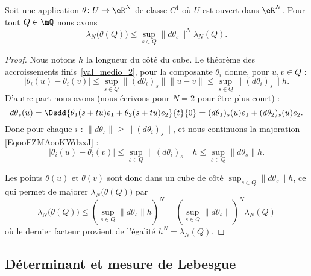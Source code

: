 \begin{lemma}      \label{LemooJCEDooBRyjRg}
	Soit une application \( \theta\colon U\to \eR^N\) de classe \( C^1\) où \( U\) est ouvert dans \( \eR^N\). Pour tout \( Q\in\mQ\) nous avons
	\begin{equation}
		\lambda_N\big( \theta(Q) \big)\leq\sup_{s\in Q}\| d\theta_s \|^N\lambda_N(Q).
	\end{equation}
\end{lemma}

\begin{proof}
	Nous notons \( h\) la longueur du côté du cube. Le théorème des accroissements finis~\ref{val_medio_2}, pour la composante \( \theta_i\) donne, pour \( u,v\in Q\) :
	\begin{equation}        \label{EqooFZMAooKWdzxJ}
		\big|  \theta_i(u)-\theta_i(v) \big|\leq\sup_{s\in Q}\| (d\theta_i)_s \|\| u-v \|\leq \sup_{s\in Q}\| (d\theta_i)_s \|h.
	\end{equation}
	D'autre part nous avons (nous écrivons pour \( N=2\) pour être plus court) :
	\begin{equation}
		d\theta_s(u)=\Dsdd{ \theta_1(s+tu)e_1+\theta_2(s+tu)e_2 }{t}{0}=(d\theta_1)_s(u)e_1+(d\theta_2)_s(u)e_2.
	\end{equation}
	Donc pour chaque \( i\) : \( \| d\theta_s \|\geq \| (d\theta_i)_s \|\), et nous continuons la majoration \eqref{EqooFZMAooKWdzxJ} :
	\begin{equation}
		\big|  \theta_i(u)-\theta_i(v) \big|\leq \sup_{s\in Q}\| (d\theta_i)_s \|h\leq \sup_{s\in Q}\| d\theta_s \|h.
	\end{equation}

	Les points \( \theta(u)\) et \( \theta(v)\) sont donc dans un cube de côté \( \sup_{s\in Q}\| d\theta_s \|h\), ce qui permet de majorer \( \lambda_N\big( \theta(Q) \big)\) par
	\begin{equation}
		\lambda_N\big( \theta(Q) \big)\leq \left( \sup_{s\in Q}\| d\theta_s \|h \right)^N=\left( \sup_{s\in Q}\| d\theta_s \| \right)^N\lambda_N(Q)
	\end{equation}
	où le dernier facteur provient de l'égalité \( h^N=\lambda_N(Q)\).
\end{proof}

\subsection{Déterminant et mesure de Lebesgue}

